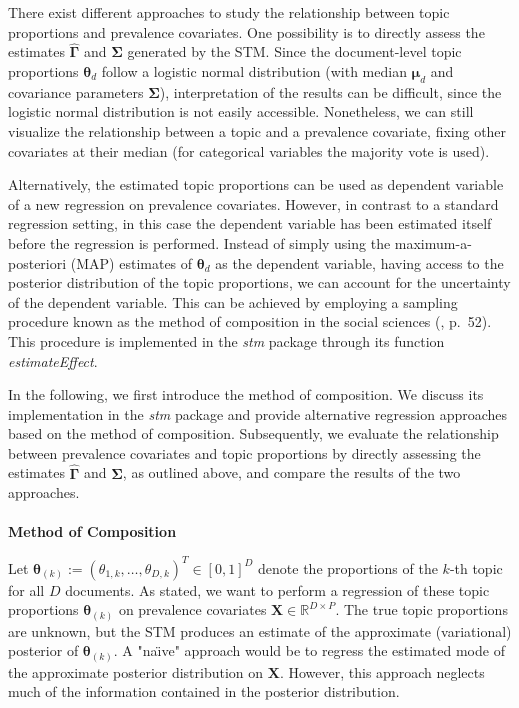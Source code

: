 There exist different approaches to study the relationship between topic proportions and prevalence covariates. One possibility is to directly assess the estimates $\hat{\boldsymbol{\Gamma}}$ and $\hat{\boldsymbol{\Sigma}}$ generated by the STM. Since the document-level topic proportions $\boldsymbol{\theta}_d$ follow a logistic normal distribution (with median $\boldsymbol{\mu}_d$ and covariance parameters $\boldsymbol{\Sigma}$), interpretation of the results can be difficult, since the logistic normal distribution is not easily accessible. Nonetheless, we can still visualize the relationship between a topic and a prevalence covariate, fixing other covariates at their median (for categorical variables the majority vote is used).

Alternatively, the estimated topic proportions can be used as dependent variable of a new regression on prevalence covariates. However, in contrast to a standard regression setting, in this case the dependent variable has been estimated itself before the regression is performed. Instead of simply using the maximum-a-posteriori (MAP) estimates of $\boldsymbol{\theta}_d$ as the dependent variable, having access to the posterior distribution of the topic proportions, we can account for the uncertainty of the dependent variable. This can be achieved by employing a sampling procedure known as the method of composition in the social sciences  (\citealp{tanner2012tools}, p.\ 52). This procedure is implemented in the \textit{stm} package through its function \textit{estimateEffect}.

In the following, we first introduce the method of composition. We discuss its implementation in the \textit{stm} package and provide alternative regression approaches based on the method of composition. Subsequently, we evaluate the relationship between prevalence covariates and topic proportions by directly assessing the estimates $\hat{\boldsymbol{\Gamma}}$ and $\hat{\boldsymbol{\Sigma}}$, as outlined above, and compare the results of the two approaches.\\
\\
\noindent \textbf{Method of Composition} \vspace{10px}

Let $\boldsymbol{\theta}_{(k)}:=(\theta_{1,k}, \dots, \theta_{D,k})^T \in [0,1]^{D}$ denote the proportions of the $k$-th topic for all $D$ documents. As stated, we want to perform a regression of these topic proportions $\boldsymbol{\theta}_{(k)}$ on prevalence covariates $\boldsymbol{X} \in \mathbb{R}^{D \times P}$. The true topic proportions are unknown, but the STM produces an estimate of the approximate (variational) posterior of $\boldsymbol{\theta}_{(k)}$. A "na{\"\i}ve" approach would be to regress the estimated mode of the approximate posterior distribution on $\boldsymbol{X}$. However, this approach neglects much of the information contained in the posterior distribution. 

